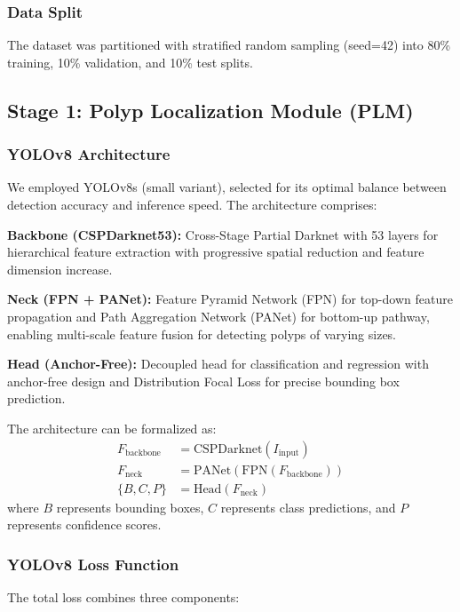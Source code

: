 \documentclass[conference]{IEEEtran}
\begin{document}
\subsubsection{Data Split}
The dataset was partitioned with stratified random sampling (seed=42) into 80\% training, 10\% validation, and 10\% test splits.

\subsection{Stage 1: Polyp Localization Module (PLM)}

\subsubsection{YOLOv8 Architecture}
We employed YOLOv8s (small variant), selected for its optimal balance between detection accuracy and inference speed. The architecture comprises:

\textbf{Backbone (CSPDarknet53):} Cross-Stage Partial Darknet with 53 layers for hierarchical feature extraction with progressive spatial reduction and feature dimension increase.

\textbf{Neck (FPN + PANet):} Feature Pyramid Network (FPN) for top-down feature propagation and Path Aggregation Network (PANet) for bottom-up pathway, enabling multi-scale feature fusion for detecting polyps of varying sizes.

\textbf{Head (Anchor-Free):} Decoupled head for classification and regression with anchor-free design and Distribution Focal Loss for precise bounding box prediction.

The architecture can be formalized as:
\begin{align}
    F_{\text{backbone}} &= \text{CSPDarknet}(I_{\text{input}}) \\
    F_{\text{neck}} &= \text{PANet}(\text{FPN}(F_{\text{backbone}})) \\
    \{B, C, P\} &= \text{Head}(F_{\text{neck}})
\end{align}
where $B$ represents bounding boxes, $C$ represents class predictions, and $P$ represents confidence scores.

\subsubsection{YOLOv8 Loss Function}
The total loss combines three components:
\end{document}
